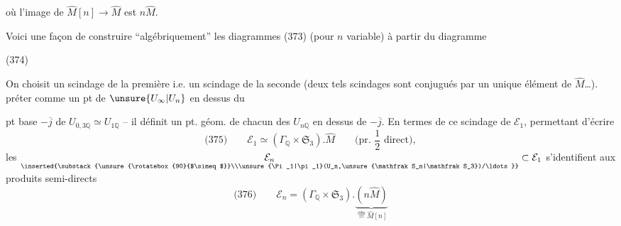 où l'image de $\widehat M[n]\longrightarrow\widehat M$ est $n\widehat M$.

Voici  une façon de construire ``algébriquement'' les diagrammes (373) (pour $n$ variable) à partir du diagramme

\noindent (374)

On choisit un  scindage de la première i.e. un scindage de la seconde (deux tels scindages sont conjugués par un unique élément de $\widehat M$\ldots).
 préter comme un pt  de $\unsure{U_\infty|U_n}$ en dessus du


pt base $-\overline j$ de $U_{0,3\mathbb Q}\simeq U_{1\mathbb Q}$ -- il définit un pt. géom. de chacun des $U_{n\mathbb Q}$ en dessus de $-\overline j$. En termes de ce scindage de $\mathcal E_1$, permettant d'écrire
\[
\text{(375)}\qquad \mathcal E_1\simeq(\Gamma_{\mathbb Q}\times\mathfrak S_3).\widehat M
\qquad\text{(pr. $\frac12$ direct)},
\]
les $\underset{\inserted{\substack{\unsure{\rotatebox{90}{$\simeq$}}\\\unsure{\Pi_1|\pi_1}(U_n,\unsure{\mathfrak S_n|\mathfrak S_3})/\ldots}}}{\mathcal E_n}\subset\mathcal E_1$ s'identifient aux produits semi-directs
\[
\text{(376)}\qquad \mathcal E_n=(\Gamma_{\mathbb Q}\times\mathfrak S_3).
\underbrace{(n\widehat M)}_{\overset{\text{dfn}}{=}\widehat M[n]}
\]

